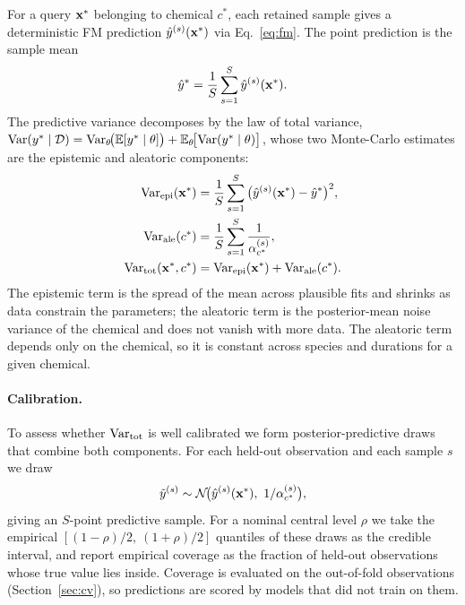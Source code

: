 For a query $\mathbf{x}^\ast$ belonging to chemical $c^\ast$, each retained sample gives
a deterministic FM prediction $\hat{y}^{(s)}(\mathbf{x}^\ast)$ via Eq.~\eqref{eq:fm}. The
point prediction is the sample mean
\begin{equation}
  \hat{y}^\ast=\frac{1}{S}\sum_{s=1}^{S}\hat{y}^{(s)}(\mathbf{x}^\ast).
\end{equation}
The predictive variance decomposes by the law of total variance,
$\mathrm{Var}(y^\ast\mid\mathcal{D})=\mathrm{Var}_\theta\!\big(\mathbb{E}[y^\ast\mid\theta]\big)
+\mathbb{E}_\theta\!\big[\mathrm{Var}(y^\ast\mid\theta)\big]$, whose two Monte-Carlo estimates are
the epistemic and aleatoric components:
\begin{align}
  \mathrm{Var}_{\mathrm{epi}}(\mathbf{x}^\ast) &= \frac{1}{S}\sum_{s=1}^{S}\big(\hat{y}^{(s)}(\mathbf{x}^\ast)-\hat{y}^\ast\big)^2,
  \label{eq:epi}\\
  \mathrm{Var}_{\mathrm{ale}}(c^\ast) &= \frac{1}{S}\sum_{s=1}^{S}\frac{1}{\alpha_{c^\ast}^{(s)}},
  \label{eq:ale}\\
  \mathrm{Var}_{\mathrm{tot}}(\mathbf{x}^\ast,c^\ast) &= \mathrm{Var}_{\mathrm{epi}}(\mathbf{x}^\ast)+\mathrm{Var}_{\mathrm{ale}}(c^\ast).
  \label{eq:tot}
\end{align}
The epistemic term is the spread of the mean across plausible fits and shrinks as
data constrain the parameters; the aleatoric term is the posterior-mean noise
variance of the chemical and does not vanish with more data. The aleatoric term
depends only on the chemical, so it is constant across species and durations for
a given chemical.

\paragraph{Calibration.} To assess whether $\mathrm{Var}_{\mathrm{tot}}$ is well
calibrated we form posterior-predictive draws that combine both components. For
each held-out observation and each sample $s$ we draw
\begin{equation}
  \tilde{y}^{(s)} \sim \Norm\!\big(\yhat^{(s)}(\xx^\ast),\ 1/\alpha_{c^\ast}^{(s)}\big),
\end{equation}
giving an $S$-point predictive sample. For a nominal central level $\rho$ we take
the empirical $[(1-\rho)/2,\ (1+\rho)/2]$ quantiles of these draws as the
credible interval, and report empirical coverage as the fraction of held-out
observations whose true value lies inside. Coverage is evaluated on the
out-of-fold observations (Section~\ref{sec:cv}), so predictions are scored by
models that did not train on them.

